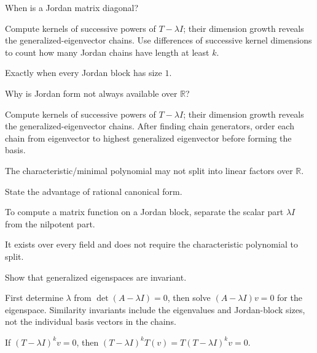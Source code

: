 \begin{exercise}\label{exr:i12-04}
When is a Jordan matrix diagonal?
\end{exercise}
\begin{hint}
Compute kernels of successive powers of \(T-\lambda I\); their dimension growth reveals the generalized-eigenvector chains. Use differences of successive kernel dimensions to count how many Jordan chains have length at least \(k\).
\end{hint}
\begin{solution}
Exactly when every Jordan block has size $1$.
\end{solution}

\begin{exercise}\label{exr:i12-05}
Why is Jordan form not always available over $\mathbb R$?
\end{exercise}
\begin{hint}
Compute kernels of successive powers of \(T-\lambda I\); their dimension growth reveals the generalized-eigenvector chains. After finding chain generators, order each chain from eigenvector to highest generalized eigenvector before forming the basis.
\end{hint}
\begin{solution}
The characteristic/minimal polynomial may not split into linear factors over $\mathbb R$.
\end{solution}

\begin{exercise}\label{exr:i12-06}
State the advantage of rational canonical form.
\end{exercise}
\begin{hint}
To compute a matrix function on a Jordan block, separate the scalar part \(\lambda I\) from the nilpotent part.
\end{hint}
\begin{solution}
It exists over every field and does not require the characteristic polynomial to split.
\end{solution}

\begin{exercise}\label{exr:i12-07}
Show that generalized eigenspaces are invariant.
\end{exercise}
\begin{hint}
First determine \(\lambda\) from \(\det(A-\lambda I)=0\), then solve \((A-\lambda I)v=0\) for the eigenspace. Similarity invariants include the eigenvalues and Jordan-block sizes, not the individual basis vectors in the chains.
\end{hint}
\begin{solution}
If $(T-\lambda I)^k v=0$, then $(T-\lambda I)^kT(v)=T(T-\lambda I)^kv=0$.
\end{solution}

